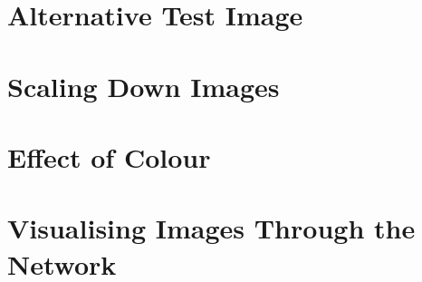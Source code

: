 \section{Alternative Test Image}


\section{Scaling Down Images}


\section{Effect of Colour}


\section{Visualising Images Through the Network}


